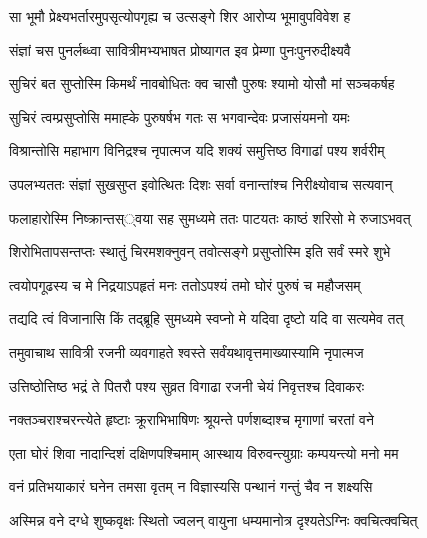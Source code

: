 \twolineshloka
{सा भूमौ प्रेक्ष्यभर्तारमुपसृत्योपगृह्य च}
{उत्सङ्गे शिर आरोप्य भूमावुपविवेश ह}


\twolineshloka
{संज्ञां चस पुनर्लब्ध्वा सावित्रीमभ्यभाषत}
{प्रोष्यागत इव प्रेम्णा पुनःपुनरुदीक्ष्यवै}


\twolineshloka
{सुचिरं बत सुप्तोस्मि किमर्थं नावबोधितः}
{क्व चासौ पुरुषः श्यामो योसौ मां सञ्चकर्षह}




\twolineshloka
{सुचिरं त्वम्प्रसुप्तोसि ममाह्के पुरुषर्षभ}
{गतः स भगवान्देवः प्रजासंयमनो यमः}


\twolineshloka
{विश्रान्तोसि महाभाग विनिद्रश्च नृपात्मज}
{यदि शक्यं समुत्तिष्ठ विगाढां पश्य शर्वरीम्}




\twolineshloka
{उपलभ्यततः संज्ञां सुखसुप्त इवोत्थितः}
{दिशः सर्वा वनान्तांश्च निरीक्ष्योवाच सत्यवान्}


\twolineshloka
{फलाहारोस्मि निष्क्रान्तस््वया सह सुमध्यमे}
{ततः पाटयतः काष्ठं शरिसो मे रुजाऽभवत्}


\twolineshloka
{शिरोभितापसन्तप्तः स्थातुं चिरमशक्नुवन्}
{तवोत्सङ्गे प्रसुप्तोस्मि इति सर्वं स्मरे शुभे}


\twolineshloka
{त्वयोपगूढस्य च मे निद्रयाऽपहृतं मनः}
{ततोऽपश्यं तमो घोरं पुरुषं च महौजसम्}


\twolineshloka
{तद्यदि त्वं विजानासि किं तद्ब्रूहि सुमध्यमे}
{स्वप्नो मे यदिवा दृष्टो यदि वा सत्यमेव तत्}


\twolineshloka
{तमुवाचाथ सावित्री रजनी व्यवगाहते}
{श्वस्ते सर्वंयथावृत्तमाख्यास्यामि नृपात्मज}


\twolineshloka
{उत्तिष्ठोत्तिष्ठ भद्रं ते पितरौ पश्य सुव्रत}
{विगाढा रजनी चेयं निवृत्तश्च दिवाकरः}


\twolineshloka
{नक्तञ्चराश्चरन्त्येते हृष्टाः क्रूराभिभाषिणः}
{श्रूयन्ते पर्णशब्दाश्च मृगाणां चरतां वने}


\twolineshloka
{एता घोरं शिवा नादान्दिशं दक्षिणपश्चिमाम्}
{आस्थाय विरुवन्त्युग्राः कम्पयन्त्यो मनो मम}




\twolineshloka
{वनं प्रतिभयाकारं घनेन तमसा वृतम्}
{न विज्ञास्यसि पन्थानं गन्तुं चैव न शक्ष्यसि}




\twolineshloka
{अस्मिन्न वने दग्धे शुष्कवृक्षः स्थितो ज्वलन्}
{वायुना धम्यमानोत्र दृश्यतेऽग्निः क्वचित्क्वचित्}


